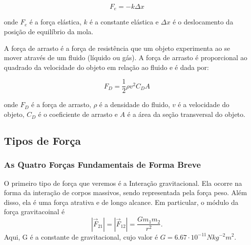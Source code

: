 \documentclass[physics_notes.tex]{subfiles}
\begin{document}
\begin{equation}
	F_e = -k \Delta x
\end{equation}

onde $F_e$ é a força elástica, $k$ é a constante elástica e $\Delta x$ é o deslocamento da posição de equilíbrio da mola.
\begin{center}
\end{center}

A força de arrasto é a força de resistência que um objeto experimenta ao se mover através de um fluido (líquido ou gás). A força de arrasto é proporcional ao quadrado da velocidade do objeto em relação ao fluido e é dada por:

\begin{equation}
	F_D = \frac{1}{2} \rho v^2 C_D A
\end{equation}

onde $F_D$ é a força de arrasto, $\rho$ é a densidade do fluido, $v$ é a velocidade do objeto, $C_D$ é o coeficiente de arrasto e $A$ é a área da seção transversal do objeto.

\begin{center}
\end{center}

\subsection{Tipos de Força}
\subsubsection{As Quatro Forças Fundamentais de Forma Breve}
O primeiro tipo de força que veremos é a Interação gravitacional. Ela ocorre na forma da interação de corpos massivos,
sendo representada pela força peso. Além disso, ela é uma força atrativa e de longo alcance. Em particular, o módulo da
força gravitacoinal é
$$
	|\vec{F}_{21}| = |\vec{F}_{12}| = \frac{Gm_{1}m_{2}}{r^{2}}.
$$
Aqui, G é a constante de gravitacional, cujo valor é $G=6.67 \cdot 10^{-11}Nkg^{-2}m^{2}.$
\end{document}
